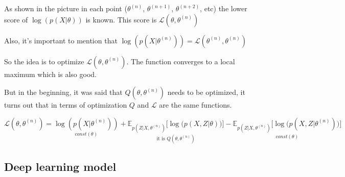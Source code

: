 As shown in the picture in each point ($\theta^{(n)}$, $\theta^{(n+1)}$, $\theta^{(n+2)}$, etc) the lower score of $\log(p(X|\theta))$ is known. This score is $\mathcal{L}(\theta, \theta^{(n)})$

Also, it's important to mention that $\log(p(X|\theta^{(n)})) = \mathcal{L}(\theta^{(n)}, \theta^{(n)})$

So the idea is to optimize $\mathcal{L}(\theta, \theta^{(n)})$. The function converges to a local maximum which is also good.

But in the beginning, it was said that $Q(\theta, \theta^{(n)})$ needs to be optimized, it turns out that in terms of optimization $Q$ and $\mathcal{L}$ 
are the same functions.

\[ \mathcal{L}(\theta, \theta^{(n)}) = \underset{const(\theta)}{\log(p(X|\theta^{(n)}))} + \underset{\text{it is } Q(\theta, \theta^{(n)})}{\mathbb{E}_{p(Z|X,\theta^{(n)})}\Big[\log\big(p(X,Z|\theta) \big) \Big]}
- \underset{const(\theta)}{\mathbb{E}_{p(Z|X,\theta^{(n)})}\Big[\log\big(p(X,Z|\theta^{(n)})\big)\Big]}
    \]

\subsection{Deep learning model}
